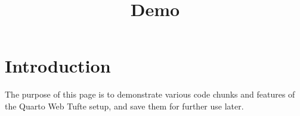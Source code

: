 \documentclass[
  letterpaper,
  DIV=11,
  numbers=noendperiod,
  oneside]{scrartcl}
\title{Demo}
\author{}
\date{}
\begin{document}
\maketitle


\section{Introduction}\label{introduction}

The purpose of this page is to demonstrate various code chunks and
features of the Quarto Web Tufte setup, and save them for further use
later.
\end{document}
